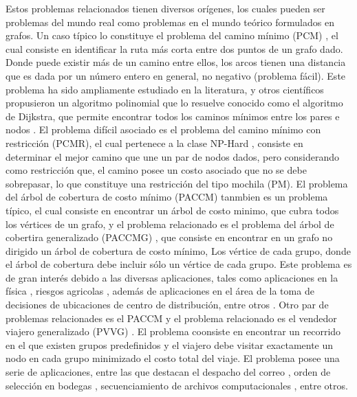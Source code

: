 Estos problemas relacionados tienen diversos orígenes, los cuales pueden ser problemas del mundo real como problemas en el mundo teórico formulados en grafos. Un caso típico lo constituye el problema del camino mínimo (PCM) \citep{papadimitriou1982combinatorial}, el cual consiste en identificar la ruta más corta entre dos puntos de un grafo dado. Donde puede existir más de un camino entre ellos, los arcos tienen una distancia que es dada por un número entero en general, no negativo (problema fácil). Este problema ha sido ampliamente estudiado en la literatura, \cite{dijkstra1959note} y otros científicos propusieron un algoritmo polinomial que lo resuelve conocido como el algoritmo de Dijkstra, que permite encontrar todos los caminos mínimos entre los pares e nodos \citep{cook1995combinatorial}. El problema difícil asociado es el problema del camino mínimo con restricción (PCMR), el cual pertenece a la clase NP-Hard \citep{handler1980dual}, consiste en determinar el mejor camino que une un par de nodos dados, pero considerando como restricción que, el camino posee un costo asociado que no se debe sobrepasar, lo que constituye una restricción del tipo mochila (PM). El problema del árbol de cobertura de costo mínimo (PACCM)\citep{papadimitriou1982combinatorial} tanmbien es un problema típico, el cual consiste en encontrar un árbol de costo minimo, que cubra todos los vértices de un grafo, y el problema relacionado es el problema del árbol de cobertira generalizado (PACCMG) \citep{dror2000generalized}, que consiste en encontrar en un grafo no dirigido un árbol de cobertura de costo mínimo, Los vértice de cada grupo, donde el árbol de cobertura debe incluir sólo un vértice de cada grupo. Este problema es de gran interés debido  a las diversas aplicaciones, tales como aplicaciones en la física \citep{kansal2001globally}, riesgos agricolas \citep{dror2000generalized}, además de aplicaciones en el área de la toma de decisiones de ubicaciones de centro de distribución, entre otros \citep{myung1995generalized}. Otro par de problemas relacionades es el PACCM y el problema relacionado es el vendedor viajero generalizado (PVVG) \citep{srivastava1969generalized}. El problema coonsiste en encontrar un recorrido en el que existen grupos predefinidos y el viajero debe visitar exactamente un nodo en cada grupo minimizado el costo total del viaje. El problema posee una serie de aplicaciones, entre las que destacan el despacho del correo \citep{laporte1996some}, orden de selección en bodegas \citep{noon1991lagrangian}, secuenciamiento de archivos computacionales \citep{henrylab1969record}, entre otros.

